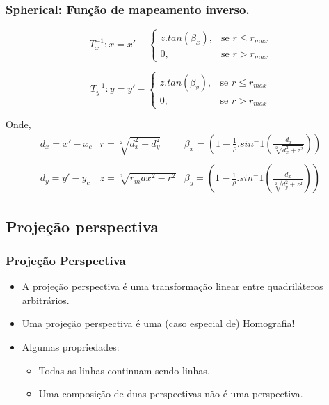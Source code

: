 \documentclass{beamer}
\begin{document}
\begin{frame}
 \frametitle{Spherical: Função de mapeamento inverso.}
  \begin{equation}
    T_x^{-1}: x = x' -
\begin{cases}
 z.tan(\beta_x), & \text{se } r \leq r_{max}\\
 0, & \text{se } r > r_{max}
\end{cases}
   \end{equation}

\begin{equation}
    T_y^{-1}: y = y' - 
\begin{cases}
 z.tan(\beta_y), & \text{se } r \leq r_{max} \\
 0, & \text{se } r > r_{max}
\end{cases}
\end{equation}

Onde,
\begin{equation}
\begin{array}{c|c|c}
d_x = x'- x_c & r = \sqrt[2]{d_x^2+d_y^2}  & \beta_x =
(1-\frac{1}{\rho}.sin^-1(\frac{d_x}{\sqrt[2]{d_x^2+z^2}}))\\
 & & \\
d_y =  y'- y_c & z = \sqrt[2]{r_max^2 - r^2} & \beta_y = 
(1-\frac{1}{\rho}.sin^-1(\frac{d_x}{\sqrt[2]{d_y^2+z^2}}))
\end{array}
\end{equation}
\end{frame}

\subsection{Projeção perspectiva}
\begin{frame}
 \frametitle{Projeção Perspectiva}
 \begin{itemize}
  \item A projeção perspectiva é uma transformação linear entre quadriláteros
arbitrários.
  \item Uma projeção perspectiva é uma (caso especial de) Homografia!
  \item Algumas propriedades:
  \begin{itemize}
   \item Todas as linhas continuam sendo linhas.
   \item Uma composição de duas perspectivas não é uma perspectiva.
  \end{itemize}
 \end{itemize}
\begin{center}
\end{center}
\end{frame}
\end{document}
